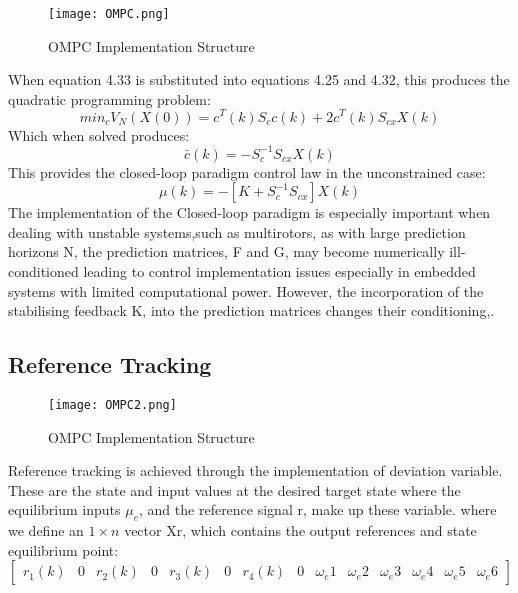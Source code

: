\documentclass[12pt,a4paper,twoside]{report}
\begin{document}
				\begin{figure}[h!]
					\centering
					\texttt{[image: OMPC.png]}
					\caption{OMPC Implementation Structure}
					\label{fig:ompcimplementationstructure}
				\end{figure}
			
				When equation 4.33 is substituted into equations 4.25 and 4.32, this produces the quadratic programming problem:
				\begin{equation}
					min_c V_N(X(0)) = c^{T}(k) S_c c(k) + 2 c^{T}(k) S_{cx}X(k)
				\end{equation}
				Which when solved produces:
				\begin{equation}
					\bar{c}(k) = - S_c^{-1}S_{cx}X(k)
				\end{equation}
				This provides the closed-loop paradigm control law in the unconstrained case:
				\begin{equation}
					\mu(k) = - [K + S_c^{-1}S_{cx}]X(k)
				\end{equation}
				The implementation of the Closed-loop paradigm is especially important when dealing with unstable systems,such as multirotors, as with large prediction horizons N, the prediction matrices, F and G, may become numerically ill-conditioned leading to control implementation issues especially in embedded systems with limited computational power. However, the incorporation of the stabilising feedback K, into the prediction matrices changes their conditioning\cite{26},\cite{27}.
				
			\subsection{Reference Tracking}
				
				\begin{figure}[h!]
					\centering
					\texttt{[image: OMPC2.png]}
					\caption{OMPC Implementation Structure}
					\label{fig:ompcimplementationstructure}
				\end{figure}
				Reference tracking is achieved through the implementation of deviation variable. These are the state and input values at the desired target state where the equilibrium inputs $\mu_e$, and the reference signal r, make up these variable. where we define an $1 \times n$ vector Xr, which contains the output references and state equilibrium point:
				\begin{equation}
					\begin{bmatrix}
						r_1(k)&0&r_2(k)&0&r_3(k)&0&r_4(k)&0&\omega_e1&\omega_e2&\omega_e3&\omega_e4&\omega_e5&\omega_e6
					\end{bmatrix}
				\end{equation}
				
\end{document}
